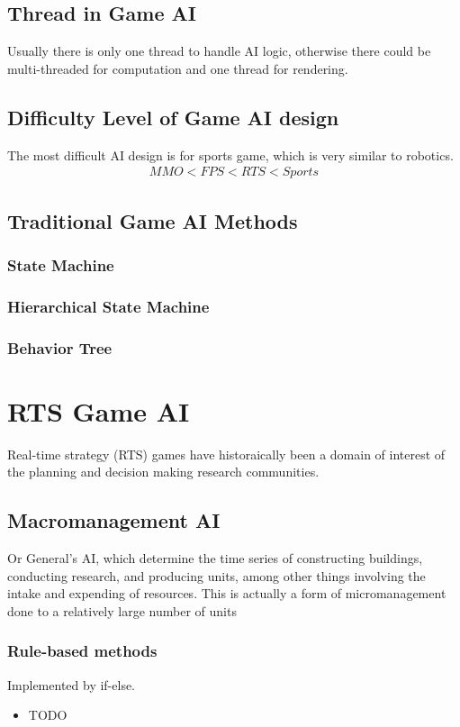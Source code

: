 \documentclass[sigconf]{acmart}
\begin{document}
\subsection{Thread in Game AI}
Usually there is only one thread to handle AI logic, otherwise there could be multi-threaded for computation and one thread for rendering.
\subsection{Difficulty Level of Game AI design}
The most difficult AI design is for sports game, which is very similar to robotics.
\begin{eqnarray*}
MMO<FPS<RTS<Sports
\end{eqnarray*}

\subsection{Traditional Game AI Methods}
\subsubsection{State Machine}
\subsubsection{Hierarchical State Machine}
\subsubsection{Behavior Tree}

\section{RTS Game AI}
Real-time strategy (RTS) games have historaically been a domain of interest of the planning and decision making research communities.
\subsection{Macromanagement AI}
Or General's AI, which determine the time series of constructing buildings, conducting research, and producing units, among other things involving the intake and expending of resources. This is actually a form of micromanagement done to a relatively large number of units
\subsubsection{Rule-based methods}
Implemented by if-else.
\begin{itemize}
\item TODO
\end{itemize}
\end{document}
